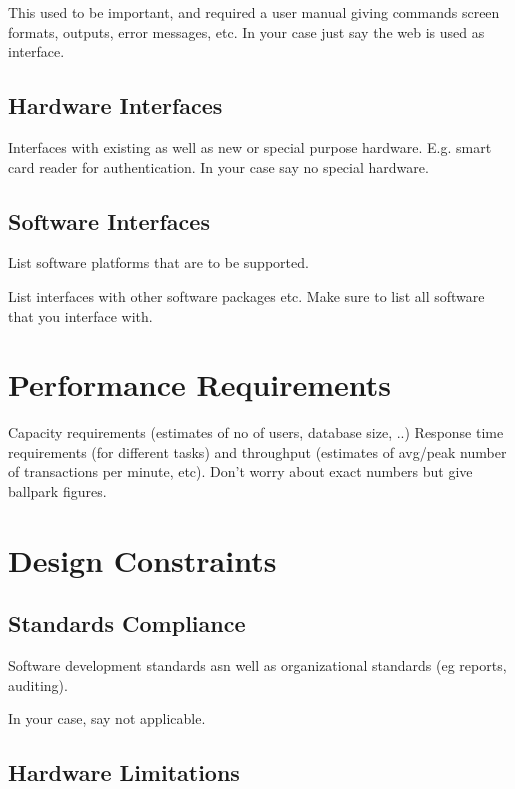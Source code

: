\documentclass[a4wide]{article}
\begin{document}
This used to be important, and required a user manual giving commands
screen formats, outputs, error messages, etc.
In your case just say the web is used as interface.

\subsection{Hardware Interfaces}

Interfaces with existing as well as new or special purpose hardware.
E.g. smart card reader for authentication.
In your case say no special hardware.

\subsection{Software Interfaces}

List software platforms that are to be supported.

List interfaces with other software packages etc.
Make sure to list all software that you interface with.



\section{Performance Requirements}

Capacity requirements (estimates of no of users, database size, ..)
Response time requirements (for different tasks)
and throughput (estimates of avg/peak number of transactions per minute, etc).
Don't worry about exact numbers but give ballpark figures.



\section{Design Constraints}

\subsection{Standards Compliance}

Software development standards asn well as organizational standards
(eg reports, auditing).

In your case, say not applicable.

\subsection{Hardware Limitations}
\end{document}
